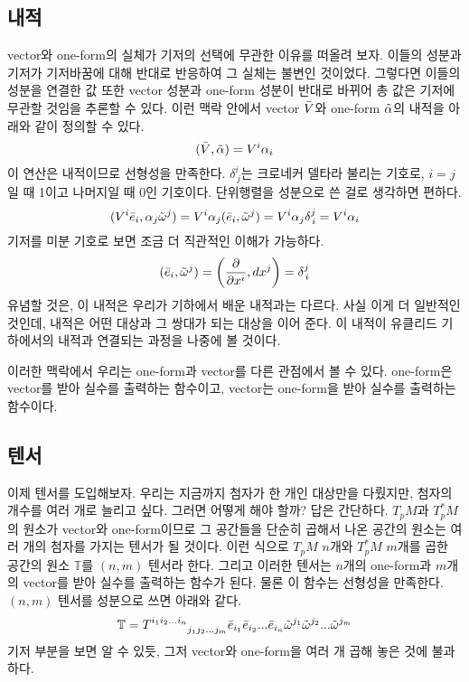\subsection{내적}
vector와 one-form의 실체가 기저의 선택에 무관한 이유를 떠올려 보자. 이들의 성분과 기저가 기저바꿈에 대해 반대로 반응하여 그 실체는 불변인 것이었다. 그렇다면 이들의 성분을 연결한 값 또한 vector 성분과 one-form 성분이 반대로 바뀌어 총 값은 기저에 무관할 것임을 추론할 수 있다. 이런 맥락 안에서 vector $\Bar{V}$와 one-form $\Tilde{\alpha}$의 내적을 아래와 같이 정의할 수 있다.
\begin{equation}
    (\Bar{V}, \Tilde{\alpha})=V^i \alpha_i
\end{equation}
이 연산은 내적이므로 선형성을 만족한다. $\delta^i_{\,j}$는 크로네커 델타라 불리는 기호로, $i=j$일 때 1이고 나머지일 때 0인 기호이다. 단위행렬을 성분으로 쓴 걸로 생각하면 편하다.
\begin{equation}
    (V^i \Bar{e}_i, \alpha_j \Tilde{\omega}^j)=V^i \alpha_j (\Bar{e}_i, \Tilde{\omega}^j)=V^i \alpha_j \delta^j_{\,i}=V^i \alpha_i
\end{equation}
기저를 미분 기호로 보면 조금 더 직관적인 이해가 가능하다.
\begin{equation}
(\Bar{e}_i, \Tilde{\omega}^j)=\left (\frac{\partial}{\partial x^i}, dx^j \right)=\delta^j_{\,i}
\end{equation}
유념할 것은, 이 내적은 우리가 기하에서 배운 내적과는 다르다. 사실 이게 더 일반적인 것인데, 내적은 어떤 대상과 그 쌍대가 되는 대상을 이어 준다. 이 내적이 유클리드 기하에서의 내적과 연결되는 과정을 나중에 볼 것이다.

이러한 맥락에서 우리는 one-form과 vector를 다른 관점에서 볼 수 있다. one-form은 vector를 받아 실수를 출력하는 함수이고, vector는 one-form을 받아 실수를 출력하는 함수이다.
\subsection{텐서}
이제 텐서를 도입해보자. 우리는 지금까지 첨자가 한 개인 대상만을 다뤘지만, 첨자의 개수를 여러 개로 늘리고 싶다. 그러면 어떻게 해야 할까? 답은 간단하다. $T_p M$과 $T_p^* M$의 원소가 vector와 one-form이므로 그 공간들을 단순히 곱해서 나온 공간의 원소는 여러 개의 첨자를 가지는 텐서가 될 것이다. 이런 식으로 $T_p M$ $n$개와 $T_p^* M$ $m$개를 곱한 공간의 원소 $\mathbb{T}$를 $(n, m)$ 텐서라 한다. 그리고 이러한 텐서는 $n$개의 one-form과 $m$개의 vector를 받아 실수를 출력하는 함수가 된다. 물론 이 함수는 선형성을 만족한다. $(n, m)$ 텐서를 성분으로 쓰면 아래와 같다.
\begin{equation}
    \mathbb{T}=T^{i_1 i_2 ... i_n}_{\qquad\quad j_1 j_2 ... j_m}\Bar{e}_{i_1}\Bar{e}_{i_2}...\Bar{e}_{i_n}\Tilde{\omega}^{j_1}\Tilde{\omega}^{j_2}...\Tilde{\omega}^{j_m}
\end{equation}
기저 부분을 보면 알 수 있듯, 그저 vector와 one-form을 여러 개 곱해 놓은 것에 불과하다.
